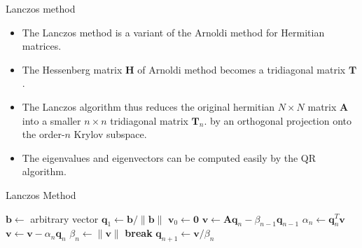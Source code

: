 \documentclass{beamer}
\begin{document}
\begin{frame}{Lanczos method}
\begin{itemize}
    \item The Lanczos method is a variant of the Arnoldi method for Hermitian matrices.
    \item The Hessenberg matrix $\mathbf{H}$ of Arnoldi method becomes a tridiagonal matrix $\mathbf{T}$.
    \item The Lanczos algorithm thus reduces the original hermitian $N\times N$ matrix $\mathbf{A}$ into a smaller $n\times n$ tridiagonal matrix $\mathbf{T}_n$.
    by an orthogonal projection onto the order-$n$ Krylov subspace.
    \item The eigenvalues and eigenvectors can be computed easily by the QR algorithm.
\end{itemize}
\end{frame}
\begin{frame}{Lanczos Method}

        \begin{algorithm}[H]
        \caption{Lanczos Algorithm}
        \begin{algorithmic}
            \State $\mathbf{b} \gets$ arbitrary vector
            \State $\mathbf{q}_1 \gets \mathbf{b} / \|\mathbf{b}\|$
            \State $\mathbf{v}_0 \gets \mathbf{0}$
                \State $\mathbf{v} \gets \mathbf{A} \mathbf{q}_n - \beta_{n-1} \mathbf{q}_{n-1}$
                \State $\alpha_n \gets \mathbf{q}_n^T \mathbf{v}$
                \State $\mathbf{v} \gets \mathbf{v} - \alpha_n \mathbf{q}_n$
                \State $\beta_n \gets \|\mathbf{v}\|$
                    \State \textbf{break}
                \EndIf
                \State $\mathbf{q}_{n+1} \gets \mathbf{v} / \beta_n$
            \EndFor
        \end{algorithmic}
        \end{algorithm}
\end{frame}
\end{document}
